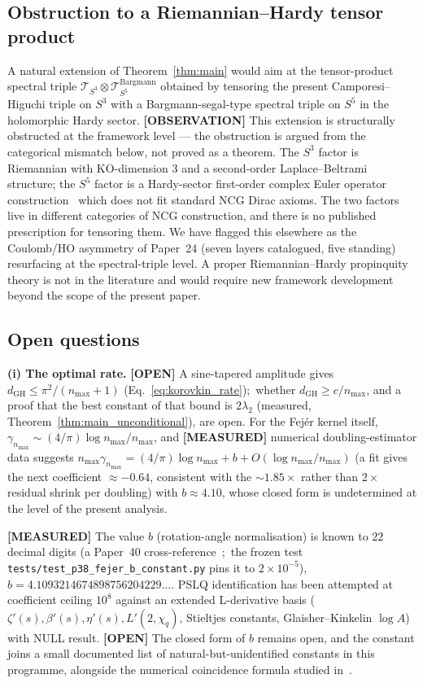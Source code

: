 \documentclass[11pt,a4paper]{article}
\theoremstyle{plain}
\theoremstyle{definition}
\newcommand{\nmax}{n_{\max}}
\newcommand{\sthree}{S^{3}}
\newcommand{\Tcal}{\mathcal{T}}
\begin{document}
\subsection{Obstruction to a Riemannian--Hardy tensor product}
\label{sec:obstruction}

A natural extension of Theorem~\ref{thm:main} would aim at the
tensor-product spectral triple $\Tcal_{\sthree} \otimes
\Tcal_{S^5}^{\mathrm{Bargmann}}$ obtained by tensoring the present
Camporesi--Higuchi triple on $\sthree$ with a Bargmann-segal-type
spectral triple on $S^5$ in the holomorphic Hardy sector.
\textbf{[OBSERVATION]} This
extension is structurally obstructed at the framework level --- the
obstruction is argued from the categorical mismatch below, not proved
as a theorem. The
$\sthree$ factor is Riemannian with KO-dimension $3$ and a
second-order Laplace--Beltrami structure; the $S^5$ factor is a
Hardy-sector first-order complex Euler operator
construction~\cite{paper24} which does not fit standard NCG Dirac
axioms. The two factors live in different categories of NCG
construction, and there is no published prescription for tensoring
them. We have flagged this elsewhere as the Coulomb/HO asymmetry of
Paper~24 (seven layers catalogued, five standing) resurfacing at the
spectral-triple level. A
proper Riemannian--Hardy propinquity theory is not in the literature
and would require new framework development beyond the scope of the
present paper.

\subsection{Open questions}\label{sec:open}

\textbf{(i) The optimal rate.} \textbf{[OPEN]} A sine-tapered amplitude
gives $d_{\mathrm{GH}} \le \pi^2/(\nmax+1)$ (Eq.~\eqref{eq:korovkin_rate});\
whether $d_{\mathrm{GH}} \ge c/\nmax$, and a proof that the best constant of
that bound is $2\lambda_2$ (measured, Theorem~\ref{thm:main_unconditional}),
are open.  For the Fej\'er
kernel itself, $\gamma_{\nmax} \sim (4/\pi) \log \nmax / \nmax$, and
\textbf{[MEASURED]} numerical doubling-estimator data suggests
$\nmax \gamma_{\nmax} = (4/\pi) \log \nmax + b + O(\log\nmax/\nmax)$
(a fit gives the next coefficient $\approx -0.64$, consistent with the
${\sim}1.85\times$ rather than $2\times$ residual shrink per doubling) with
$b \approx 4.10$, whose closed form is undetermined at the level of
the present analysis.

\textbf{[MEASURED]} The value $b$ (rotation-angle
normalisation) is known to $22$ decimal digits (a
Paper~40 cross-reference~\cite{paper40_unified};\ the frozen test
\texttt{tests/test\_p38\_fejer\_b\_constant.py} pins it to $2 \times 10^{-5}$),
$b = 4.1093214674898756204229\ldots$. PSLQ
identification has been attempted at coefficient ceiling $10^8$
against an extended L-derivative basis ($\zeta'(s), \beta'(s),
\eta'(s), L'(2, \chi_q)$, Stieltjes constants, Glaisher--Kinkelin
$\log A$) with NULL result. \textbf{[OPEN]} The closed form of $b$
remains open, and the constant joins a
small documented list of natural-but-unidentified constants in this
programme, alongside the numerical coincidence formula studied
in~\cite{paper2}.
\end{document}
